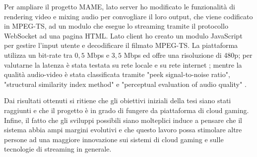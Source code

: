 \documentclass{article} %
\begin{document}
Per ampliare il progetto MAME, lato server ho modificato le funzionalità di rendering video e mixing audio per convogliare il loro output, che viene codificato in MPEG-TS, ad un modulo che esegue lo streaming tramite il protocollo WebSocket ad una pagina HTML. Lato client ho creato un modulo JavaScript per gestire l'input utente e decodificare il filmato MPEG-TS. La piattaforma utilizza un bit-rate tra $0,5$ Mbps e $3,5$ Mbps ed offre una risoluzione di 480p; per valutarne la latenza è stata testata su rete locale e su rete internet \parencite{Latency_analysis_for_M2M}; mentre la qualità audio-video è stata classificata tramite "peek signal-to-noise ratio", "structural similarity index method" e "perceptual evaluation of audio quality" \parencite{Cloud_Gaming_Architecture_and_Performance}.

Dai risultati ottenuti si ritiene che gli obiettivi iniziali della tesi siano stati raggiunti e che il progetto è in grado di fungere da piattaforma di cloud gaming. Infine, il fatto che gli sviluppi possibili siano molteplici induce a pensare che il sistema abbia ampi margini evolutivi e che questo lavoro possa stimolare altre persone ad una maggiore innovazione sui sistemi di cloud gaming e sulle tecnologie di streaming in generale.

\printbibliography[nottype=misc,title={Bibliografia},heading=bibintoc]
\printbibliography[type=misc,title={Sitografia},heading=bibintoc]
\end{document}
